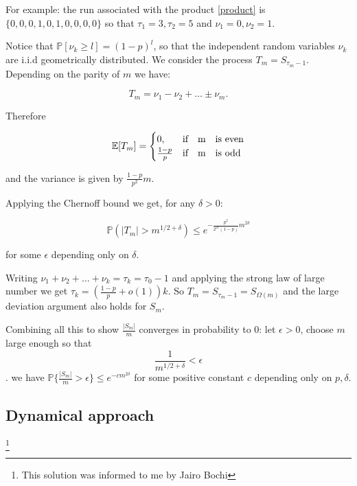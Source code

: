 \documentclass{article}
\begin{document}
For example: the run associated with the product  \ref{product} is
$\{0,0,0,1,0,1,0,0,0,0\}$ so that $\tau_1=3,\tau_2=5$ and $\nu_1=0,\nu_2=1$.

Notice that $\mathbb{P}[\nu_k\geq l]=(1-p)^l$, so that the independent
random variables $\nu_k$ are i.i.d geometrically distributed. We 
consider the process $T_m=S_{\tau_m -1}$. Depending on the parity of $m$
we have:

\begin{equation}
    T_m=\nu_1-\nu_2+\ldots \pm\nu_m.
\end{equation}

Therefore

\begin{align*}
    \mathbb{E}[T_m]=
    \begin{cases}
        0, & \text{if}\quad $m$ \quad \text{is even} \\
        \frac{1-p}{p} & \text{if}\quad $m$ \quad \text{is odd}
    \end{cases}
\end{align*}

and the variance is given by $\frac{1-p}{p^2}m$.

Applying the Chernoff bound we get, for any $\delta>0:$

\begin{equation*}
    \mathbb{P}(|T_m|>m^{1/2+\delta})\leq e^{-\frac{p^2}{2^{2\epsilon}(1-p)}
    m^{2\delta}}
\end{equation*}

for some $\epsilon$ depending only on $\delta$.



Writing $\nu_1+\nu_2+\ldots+\nu_k=\tau_k=\tau_0-1$ and applying the 
strong law of large number we get $\tau_k=(\frac{1-p}{p}+o(1))k$.
So $T_m=S_{\tau_m -1}=S_{\Omega(m)}$ and the large deviation argument
also holds for $S_m$. 

Combining all this to show $\frac{|S_m|}{m}$ converges in probability to 0:
let $\epsilon>0$, choose $m$ large enough so that $$\frac{1}{m^{1/2+\delta}}<\epsilon$$.
we have $\mathbb{P}\{\frac{|S_m|}{m}>\epsilon\}\leq e^{-cm^{2\delta}}$ for some
positive constant $c$ depending only on $p,\delta$.



\subsection{Dynamical approach}\footnote{This solution was  informed to me by Jairo Bochi}
\end{document}
